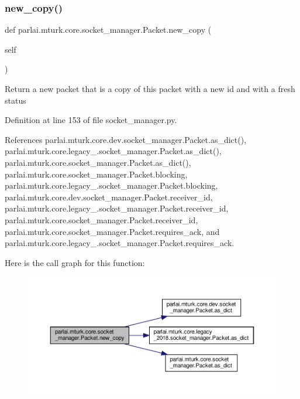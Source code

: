 \subsubsection{\texorpdfstring{new\+\_\+copy()}{new\_copy()}}
{\footnotesize\ttfamily def parlai.\+mturk.\+core.\+socket\+\_\+manager.\+Packet.\+new\+\_\+copy (\begin{DoxyParamCaption}\item[{}]{self }\end{DoxyParamCaption})}

\begin{DoxyVerb}Return a new packet that is a copy of this packet with
a new id and with a fresh status
\end{DoxyVerb}
 

Definition at line 153 of file socket\+\_\+manager.\+py.



References parlai.\+mturk.\+core.\+dev.\+socket\+\_\+manager.\+Packet.\+as\+\_\+dict(), parlai.\+mturk.\+core.\+legacy\+\_.\+socket\+\_\+manager.\+Packet.\+as\+\_\+dict(), parlai.\+mturk.\+core.\+socket\+\_\+manager.\+Packet.\+as\+\_\+dict(), parlai.\+mturk.\+core.\+socket\+\_\+manager.\+Packet.\+blocking, parlai.\+mturk.\+core.\+legacy\+\_.\+socket\+\_\+manager.\+Packet.\+blocking, parlai.\+mturk.\+core.\+dev.\+socket\+\_\+manager.\+Packet.\+receiver\+\_\+id, parlai.\+mturk.\+core.\+legacy\+\_.\+socket\+\_\+manager.\+Packet.\+receiver\+\_\+id, parlai.\+mturk.\+core.\+socket\+\_\+manager.\+Packet.\+receiver\+\_\+id, parlai.\+mturk.\+core.\+socket\+\_\+manager.\+Packet.\+requires\+\_\+ack, and parlai.\+mturk.\+core.\+legacy\+\_.\+socket\+\_\+manager.\+Packet.\+requires\+\_\+ack.

Here is the call graph for this function\+:
\nopagebreak
\begin{figure}[H]
\begin{center}
\leavevmode
\includegraphics[width=350pt]{classparlai_1_1mturk_1_1core_1_1socket__manager_1_1Packet_a308912fbfb5d9423d882100db5c79756_cgraph}
\end{center}
\end{figure}
\mbox{\label{classparlai_1_1mturk_1_1core_1_1socket__manager_1_1Packet_a739506a92dd4482116b64e2e2d4671f2}} 
